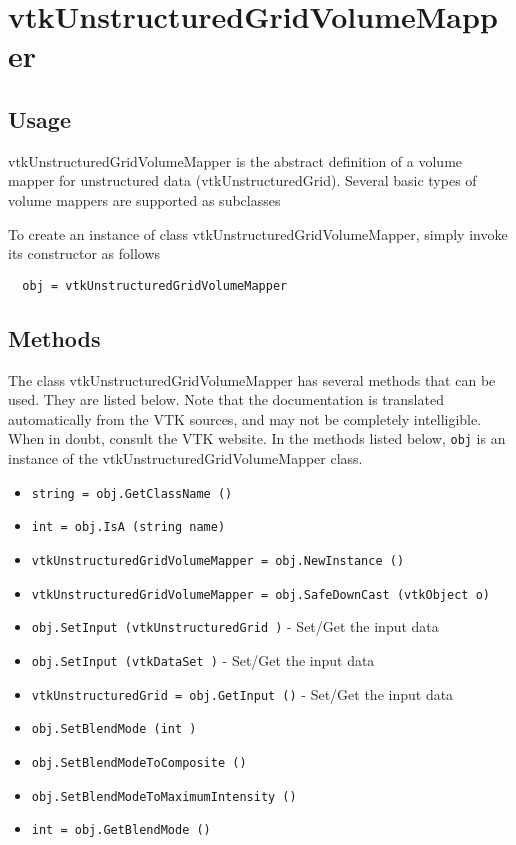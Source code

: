 \section{vtkUnstructuredGridVolumeMapper}

\subsection{Usage}

 vtkUnstructuredGridVolumeMapper is the abstract definition of a volume mapper for 
 unstructured data (vtkUnstructuredGrid).  Several  basic types of volume mappers 
 are supported as subclasses

To create an instance of class vtkUnstructuredGridVolumeMapper, simply
invoke its constructor as follows
\begin{verbatim}
  obj = vtkUnstructuredGridVolumeMapper
\end{verbatim}
\subsection{Methods}

The class vtkUnstructuredGridVolumeMapper has several methods that can be used.
  They are listed below.
Note that the documentation is translated automatically from the VTK sources,
and may not be completely intelligible.  When in doubt, consult the VTK website.
In the methods listed below, \verb|obj| is an instance of the vtkUnstructuredGridVolumeMapper class.
\begin{itemize}
\item  \verb|string = obj.GetClassName ()|

\item  \verb|int = obj.IsA (string name)|

\item  \verb|vtkUnstructuredGridVolumeMapper = obj.NewInstance ()|

\item  \verb|vtkUnstructuredGridVolumeMapper = obj.SafeDownCast (vtkObject o)|

\item  \verb|obj.SetInput (vtkUnstructuredGrid )| -  Set/Get the input data

\item  \verb|obj.SetInput (vtkDataSet )| -  Set/Get the input data

\item  \verb|vtkUnstructuredGrid = obj.GetInput ()| -  Set/Get the input data

\item  \verb|obj.SetBlendMode (int )|

\item  \verb|obj.SetBlendModeToComposite ()|

\item  \verb|obj.SetBlendModeToMaximumIntensity ()|

\item  \verb|int = obj.GetBlendMode ()|

\end{itemize}
